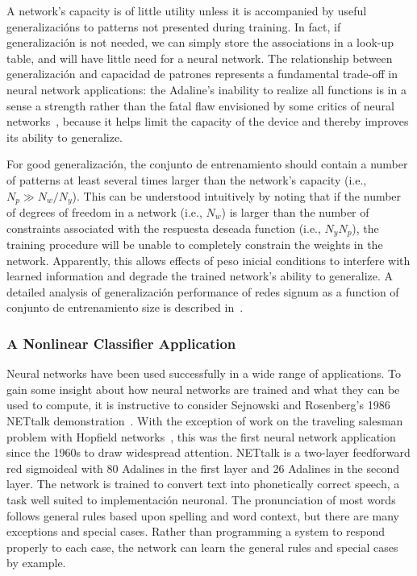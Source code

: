 \documentclass[10pt,twocolumn]{article}
\begin{document}
A network's capacity is of little utility unless it is accompanied by useful
generalizacións to patterns not presented during training. In fact, if
generalización is not needed, we can simply store the associations in a look-up
table, and will have little need for a neural network. The relationship between
generalización and capacidad de patrones represents a fundamental trade-off in neural
network applications: the Adaline's inability to realize all functions is in a
sense a strength rather than the fatal flaw envisioned by some critics of neural
networks~\cite{minsky}, because it helps limit the capacity of the device and
thereby improves its ability to generalize.

For good generalización, the conjunto de entrenamiento should contain a number of patterns at
least several times larger than the network's capacity (i.e., $N_p \gg N_w/N_y$).
This can be understood intuitively by noting that if the number of degrees of
freedom in a network (i.e., $N_w$) is larger than the number of constraints
associated with the respuesta deseada function (i.e., $N_y N_p$), the training
procedure will be unable to completely constrain the weights in the network.
Apparently, this allows effects of peso inicial conditions to interfere with
learned information and degrade the trained network's ability to generalize. A
detailed analysis of generalización performance of redes signum as a function
of conjunto de entrenamiento size is described in~\cite{baumhaussler}.

\subsubsection*{A Nonlinear Classifier Application}
Neural networks have been used successfully in a wide range of applications. To
gain some insight about how neural networks are trained and what they can be used
to compute, it is instructive to consider Sejnowski and Rosenberg's 1986 NETtalk
demonstration~\cite{nettalk2}. With the exception of work on the traveling
salesman problem with Hopfield networks~\cite{hoptank}, this was the first neural
network application since the 1960s to draw widespread attention. NETtalk is a
two-layer feedforward red sigmoideal with 80 Adalines in the first layer and 26
Adalines in the second layer. The network is trained to convert text into
phonetically correct speech, a task well suited to implementación neuronal. The
pronunciation of most words follows general rules based upon spelling and word
context, but there are many exceptions and special cases. Rather than programming
a system to respond properly to each case, the network can learn the general
rules and special cases by example.
\end{document}
